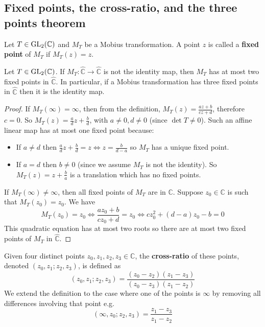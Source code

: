 \subsection{Fixed points, the cross-ratio, and the three points theorem}

\begin{definition}
	Let $T \in \text{GL}_2(\mathbb{C})$ and $M_T$ be a Mobius transformation. A point $z$ is called a \textbf{fixed point} of $M_T$ if $M_T(z) = z$. 
\end{definition}

\begin{lemma}\label{lem:threeFixedPointsImpliesIdentity}
	Let $T \in \text{GL}_2(\mathbb{C})$. If $M_T: \hat{\mathbb{C}} \rightarrow \hat{\mathbb{C}}$ is not the identity map, then $M_T$ has at most two fixed points in $\hat{\mathbb{C}}$. In particular, if a Mobius transformation has three fixed points in $\hat{\mathbb{C}}$ then it is the identity map.
\end{lemma}

\begin{proof}
	If $M_T(\infty) = \infty$, then from the definition, $M_T(z) = \frac{az + b}{cz + d}$, therefore $c = 0$. So $M_T(z) = \frac{a}{d}z + \frac{b}{d}$, with $a \ne 0, d \ne 0$ (since $\det T \ne 0$). Such an affine linear map has at most one fixed point because:
	\begin{itemize}
		\item If $a \ne d$ then $\frac{a}{d}z + \frac{b}{d} = z \Longleftrightarrow z = \frac{b}{d - a}$ so $M_T$ has a unique fixed point.
		\item If $a = d$ then $b \ne 0$ (since we assume $M_T$ is not the identity). So $M_T(z) = z + \frac{b}{a}$ is a translation which has no fixed points.
	\end{itemize}
	If $M_T(\infty) \ne \infty$, then all fixed points of $M_T$ are in $\mathbb{C}$. Suppose $z_0 \in \mathbb{C}$ is such that $M_T(z_0) = z_0$. We have
	\[
		M_T(z_0) = z_0 \Longleftrightarrow \frac{a z_0 + b}{c z_0 + d} = z_0 \Longleftrightarrow c z_0 ^ 2 + (d - a)z_0 - b = 0
	\]
	This quadratic equation has at most two roots so there are at most two fixed points of $M_T$ in $\hat{\mathbb{C}}$.
\end{proof}

\begin{definition}
	Given four distinct points $z_0, z_1, z_2, z_3 \in \mathbb{C}$, the \textbf{cross-ratio} of these points, denoted $(z_0, z_1; z_2, z_3)$, is defined as
	\[
		(z_0, z_1; z_2, z_3) = \frac{(z_0 - z_2)(z_1 - z_3)}{(z_0 - z_3)(z_1 - z_2)}
	\]
	We extend the definition to the case where one of the points is $\infty$ by removing all differences involving that point e.g.
	\[
		(\infty, z_0; z_2, z_3) = \frac{z_1 - z_3}{z_1 - z_2}
	\]
\end{definition}

